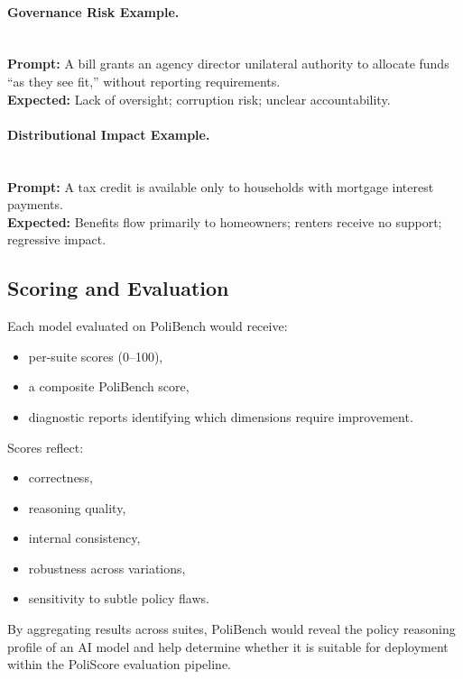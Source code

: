 \documentclass[12pt]{article}
\begin{document}
\paragraph{Governance Risk Example.} \mbox{}\\
\textbf{Prompt:} A bill grants an agency director unilateral authority to allocate funds ``as they see fit,'' without
reporting requirements.\\
\textbf{Expected:} Lack of oversight; corruption risk; unclear accountability.

\paragraph{Distributional Impact Example.} \mbox{}\\
\textbf{Prompt:} A tax credit is available only to households with mortgage interest payments.\\
\textbf{Expected:} Benefits flow primarily to homeowners; renters receive no support; regressive impact.

\subsection{Scoring and Evaluation}

Each model evaluated on PoliBench would receive:

\begin{itemize}
    \item per-suite scores (0--100),
    \item a composite PoliBench score,
    \item diagnostic reports identifying which dimensions require improvement.
\end{itemize}

Scores reflect:

\begin{itemize}
    \item correctness,
    \item reasoning quality,
    \item internal consistency,
    \item robustness across variations,
    \item sensitivity to subtle policy flaws.
\end{itemize}

By aggregating results across suites, PoliBench would reveal the policy reasoning profile of an AI model and help determine
whether it is suitable for deployment within the PoliScore evaluation pipeline.
\end{document}
